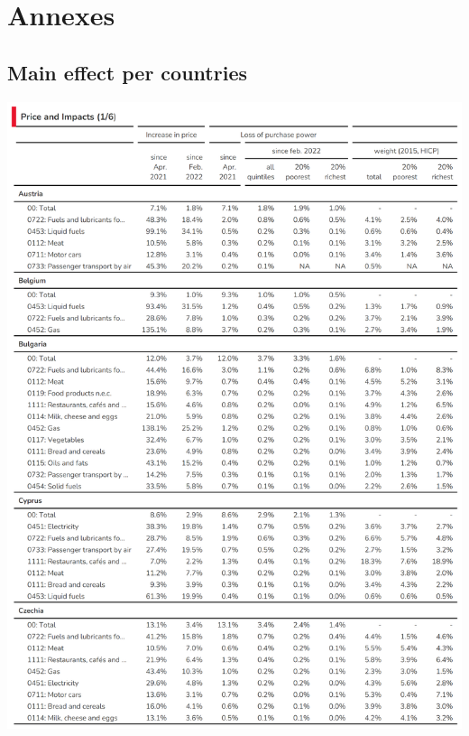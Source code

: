 \documentclass[
  9pt,
  a4paper,
  DIV=11,
  numbers=noendperiod,
  oneside]{scrartcl}
\begin{document}
\newpage

\hypertarget{annexes}{%
\section{Annexes}\label{annexes}}

\hypertarget{main-effect-per-countries}{%
\subsection{Main effect per countries}\label{main-effect-per-countries}}

\includegraphics[width=17cm,height=\textheight]{../svg/annex_1.png}
\end{document}
